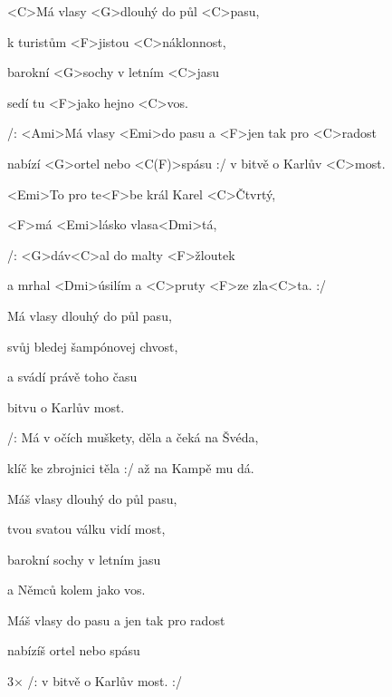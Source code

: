 

\zs
<C>Má vlasy <G>dlouhý do půl <C>pasu,

k turistům <F>jistou <C>náklonnost,

barokní <G>sochy v letním <C>jasu

sedí tu <F>jako hejno <C>vos.

/: <Ami>Má vlasy <Emi>do pasu a <F>jen tak pro <C>radost

nabízí <G>ortel nebo <C(F)>spásu :/ v bitvě o Karlův <C>most.
\ks

\zr
<Emi>To pro te<F>be král Karel <C>Čtvrtý,

<F>má <Emi>lásko vlasa<Dmi>tá,

/: <G>dáv<C>al do malty <F>žloutek

a mrhal <Dmi>úsilím a <C>pruty <F>ze zla<C>ta. :/
\kr

\zs
Má vlasy dlouhý do půl pasu,

svůj bledej šampónovej chvost,

a svádí právě toho času

bitvu o Karlův most.


/: Má v očích muškety, děla a čeká na Švéda,

klíč ke zbrojnici těla :/ až na Kampě mu dá.
\ks


\zr \kr

\zs

Máš vlasy dlouhý do půl pasu,

tvou svatou válku vidí most,

barokní sochy v letním jasu

a Němců kolem jako vos.



Máš vlasy do pasu a jen tak pro radost

nabízíš ortel nebo spásu

3× /: v bitvě o Karlův most. :/
\ks

\kp
